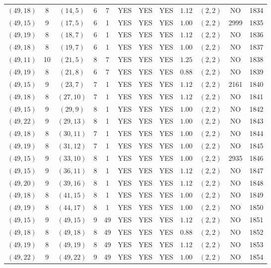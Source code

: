 \begin{longtable}{|c|c|c|c|c|c|c|c|c|c|c|c|}
$(49,18)$ & 8 & $(14,5)$ & 6 & 7 & YES & YES & YES & $1.12$ & $(2,2)$ & NO & 1834\\
$(49,15)$ & 9 & $(17,5)$ & 6 & 1 & YES & YES & YES & $1.00$ & $(2,2)$ & 2999 & 1835\\
$(49,19)$ & 8 & $(18,7)$ & 6 & 1 & YES & YES & YES & $1.12$ & $(2,2)$ & NO & 1836\\
$(49,18)$ & 8 & $(19,7)$ & 6 & 1 & YES & YES & YES & $1.00$ & $(2,2)$ & NO & 1837\\
$(49,11)$ & 10 & $(21,5)$ & 8 & 7 & YES & YES & YES & $1.25$ & $(2,2)$ & NO & 1838\\
$(49,19)$ & 8 & $(21,8)$ & 6 & 7 & YES & YES & YES & $0.88$ & $(2,2)$ & NO & 1839\\
$(49,15)$ & 9 & $(23,7)$ & 7 & 1 & YES & YES & YES & $1.12$ & $(2,2)$ & 2161 & 1840\\
$(49,18)$ & 8 & $(27,10)$ & 7 & 1 & YES & YES & YES & $1.12$ & $(2,2)$ & NO & 1841\\
$(49,15)$ & 9 & $(29,9)$ & 8 & 1 & YES & YES & YES & $1.00$ & $(2,2)$ & NO & 1842\\
$(49,22)$ & 9 & $(29,13)$ & 8 & 1 & YES & YES & YES & $1.00$ & $(2,2)$ & NO & 1843\\
$(49,18)$ & 8 & $(30,11)$ & 7 & 1 & YES & YES & YES & $1.00$ & $(2,2)$ & NO & 1844\\
$(49,19)$ & 8 & $(31,12)$ & 7 & 1 & YES & YES & YES & $1.00$ & $(2,2)$ & NO & 1845\\
$(49,15)$ & 9 & $(33,10)$ & 8 & 1 & YES & YES & YES & $1.00$ & $(2,2)$ & 2935 & 1846\\
$(49,15)$ & 9 & $(36,11)$ & 8 & 1 & YES & YES & YES & $1.12$ & $(2,2)$ & NO & 1847\\
$(49,20)$ & 9 & $(39,16)$ & 8 & 1 & YES & YES & YES & $1.12$ & $(2,2)$ & NO & 1848\\
$(49,18)$ & 8 & $(41,15)$ & 8 & 1 & YES & YES & YES & $1.00$ & $(2,2)$ & NO & 1849\\
$(49,19)$ & 8 & $(44,17)$ & 8 & 1 & YES & YES & YES & $1.00$ & $(2,2)$ & NO & 1850\\
$(49,15)$ & 9 & $(49,15)$ & 9 & 49 & YES & YES & YES & $1.12$ & $(2,2)$ & NO & 1851\\
$(49,18)$ & 8 & $(49,18)$ & 8 & 49 & YES & YES & YES & $0.88$ & $(2,2)$ & NO & 1852\\
$(49,19)$ & 8 & $(49,19)$ & 8 & 49 & YES & YES & YES & $1.12$ & $(2,2)$ & NO & 1853\\
$(49,22)$ & 9 & $(49,22)$ & 9 & 49 & YES & YES & YES & $1.00$ & $(2,2)$ & NO & 1854\\

\end{longtable}
